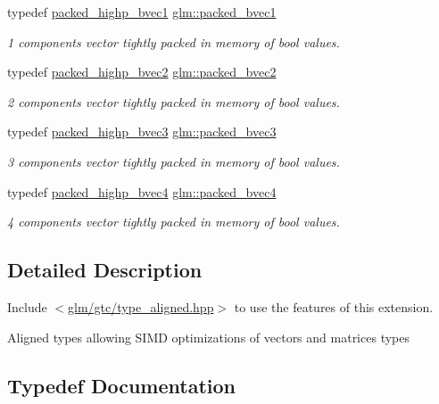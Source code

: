 \begin{DoxyCompactItemize}
typedef \hyperlink{group__gtc__type__aligned_ga00ef8acfca23dca78e1baa65bb5861ac}{packed\+\_\+highp\+\_\+bvec1} \hyperlink{group__gtc__type__aligned_ga9afdf9c24a30d7c6c46fa29011908ac5}{glm\+::packed\+\_\+bvec1}
\begin{DoxyCompactList}\small\item\em 1 components vector tightly packed in memory of bool values. \end{DoxyCompactList}\item 
typedef \hyperlink{group__gtc__type__aligned_ga8059c50785881a9f30b9a8e3ff5daf83}{packed\+\_\+highp\+\_\+bvec2} \hyperlink{group__gtc__type__aligned_gabbb5ab4c9a0de67e04e2f183c0bff576}{glm\+::packed\+\_\+bvec2}
\begin{DoxyCompactList}\small\item\em 2 components vector tightly packed in memory of bool values. \end{DoxyCompactList}\item 
typedef \hyperlink{group__gtc__type__aligned_gafad47eaff82deab03a1e8d82d2dbd046}{packed\+\_\+highp\+\_\+bvec3} \hyperlink{group__gtc__type__aligned_gae53d997456f6336eab2450117b11163e}{glm\+::packed\+\_\+bvec3}
\begin{DoxyCompactList}\small\item\em 3 components vector tightly packed in memory of bool values. \end{DoxyCompactList}\item 
typedef \hyperlink{group__gtc__type__aligned_gaa7a006e26052e668a16bf3b8bd81cbef}{packed\+\_\+highp\+\_\+bvec4} \hyperlink{group__gtc__type__aligned_ga27837cfec1a5b6d6ae23961f93431403}{glm\+::packed\+\_\+bvec4}
\begin{DoxyCompactList}\small\item\em 4 components vector tightly packed in memory of bool values. \end{DoxyCompactList}\end{DoxyCompactItemize}


\subsection{Detailed Description}
Include $<$\hyperlink{gtc_2type__aligned_8hpp}{glm/gtc/type\+\_\+aligned.\+hpp}$>$ to use the features of this extension.

Aligned types allowing S\+I\+MD optimizations of vectors and matrices types 

\subsection{Typedef Documentation}
\mbox{\label{group__gtc__type__aligned_ga7db5fd015b60682f3fdfe9cab47188dd}} 
